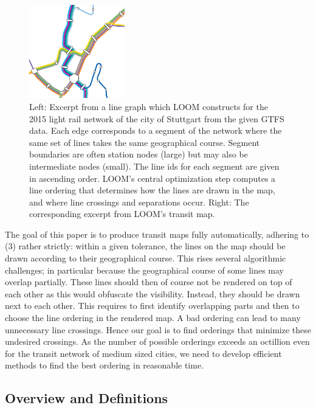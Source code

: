 \documentclass[sigconf]{acmart}
\begin{document}
\begin{figure}
  \centering
  
  \hspace{2cm}
  \includegraphics[trim={0cm 0 2.47cm 4.07cm},clip,width=0.37\textwidth]{render_examples/vvs_cropped.pdf}
  \caption{Left: Excerpt from a line graph which LOOM constructs for the 2015 light rail network of the city of Stuttgart from the given GTFS data. Each edge corresponds to a segment of the network where the same set of lines takes the same geographical course. Segment boundaries are often station nodes (large) but may also be intermediate nodes (small). The line ids for each segment are given in ascending order. LOOM's central optimization step computes a line ordering that determines how the lines are drawn in the map, and where line crossings and separations occur. Right: The corresponding excerpt from LOOM's transit map.}
  \label{FIG:transitgraphvvs}
\end{figure}
The goal of this paper is to produce transit maps fully automatically, adhering to (3) rather strictly: within a given tolerance, the lines on the map should be drawn according to their geographical course. This rises several algorithmic challenges; in particular because the geographical course of some lines may overlap partially. These lines should then of course not be rendered on top of each other as this would obfuscate the visibility. Instead, they should be drawn next to each other. This requires to first identify overlapping parts and then to choose the line ordering in the rendered map. A bad ordering can lead to many unnecessary line crossings. Hence our goal is to find orderings that minimize these undesired crossings. As the number of possible orderings exceeds an octillion even for the transit network of medium sized cities, we need to develop efficient methods to find the best ordering in reasonable time.

\def\Hl{L}

\subsection{Overview and Definitions}\label{SEC:intro:definition}
\end{document}
